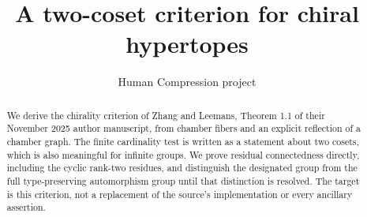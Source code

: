 
\title{A two-coset criterion for chiral hypertopes}
\author{Human Compression project}
\maketitle
\begin{abstract}
We derive the chirality criterion of Zhang and Leemans, Theorem 1.1 of their November 2025 author manuscript, from chamber fibers and an explicit reflection of a chamber graph. The finite cardinality test is written as a statement about two cosets, which is also meaningful for infinite groups. We prove residual connectedness directly, including the cyclic rank-two residues, and distinguish the designated group from the full type-preserving automorphism group until that distinction is resolved. The target is this criterion, not a replacement of the source's implementation or every ancillary assertion.
\end{abstract}


